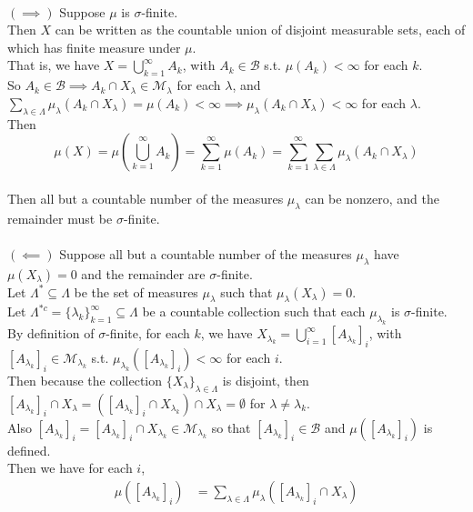 \begin{enumerate}
\begin{enumerate}[label=(\roman*),align=left]
		\\$(\implies)$ Suppose $\mu$ is $\sigma$-finite.\\
		Then $X$ can be written as the countable union of disjoint measurable sets, each of which has finite measure under $\mu$.
		\\That is, we have $X=\bigcup_{k=1}^\infty A_k$, with $A_k\in\mathcal{B}$ s.t. $\mu(A_k)<\infty$ for each $k$.
		\\So $A_k\in\mathcal{B}\implies A_k\cap X_\lambda\in\mathcal{M}_\lambda$ for each $\lambda$, and $\sum_{\lambda\in\Lambda} \mu_\lambda(A_k\cap X_\lambda)=\mu(A_k)<\infty\implies\mu_\lambda(A_k\cap X_\lambda)<\infty$ for each $\lambda$.
		\\Then 
		\[
			\mu(X)=\mu(\bigcup_{k=1}^\infty A_k)=\sum_{k=1}^\infty\mu(A_k)=\sum_{k=1}^\infty\sum_{\lambda\in\Lambda} \mu_\lambda(A_k\cap X_\lambda)
		\]
		\\Then all but a countable number of the measures $\mu_\lambda$ can be nonzero, and the remainder must be $\sigma$-finite.\\
		\\$(\impliedby)$ Suppose all but a countable number of the measures $\mu_\lambda$ have $\mu(X_\lambda)=0$ and the remainder are $\sigma$-finite.\\
		Let $\Lambda^*\subseteq\Lambda$ be the set of measures $\mu_\lambda$ such that $\mu_\lambda(X_\lambda)=0$.
		\\Let $\Lambda^{*c}=\{\lambda_k\}_{k=1}^\infty\subseteq\Lambda$ be a countable collection such that each $\mu_{\lambda_k}$ is $\sigma$-finite.
		\\By definition of $\sigma$-finite, for each $k$, we have $X_{\lambda_k}=\bigcup_{i=1}^\infty [A_{\lambda_k}]_i$, with $[A_{\lambda_k}]_i\in\mathcal{M}_{\lambda_k}$ s.t. $\mu_{\lambda_k}([A_{\lambda_k}]_i)<\infty$ for each $i$.
		\\Then because the collection $\{X_\lambda\}_{\lambda\in\Lambda}$ is disjoint, then $[A_{\lambda_k}]_i\cap X_\lambda=([A_{\lambda_k}]_i\cap X_{\lambda_k})\cap X_\lambda=\emptyset$ for $\lambda\neq\lambda_k$.
		\\Also $[A_{\lambda_k}]_i=[A_{\lambda_k}]_i\cap X_{\lambda_k}\in\mathcal{M}_{\lambda_k}$ so that $[A_{\lambda_k}]_i\in\mathcal{B}$ and $\mu([A_{\lambda_k}]_i)$ is defined.
		\\Then we have for each $i$,
		\begin{align*}
			\mu([A_{\lambda_k}]_i)&=\sum_{\lambda\in\Lambda} \mu_\lambda([A_{\lambda_k}]_i\cap X_\lambda)\\

\end{align*}
\end{enumerate}
\end{enumerate}
